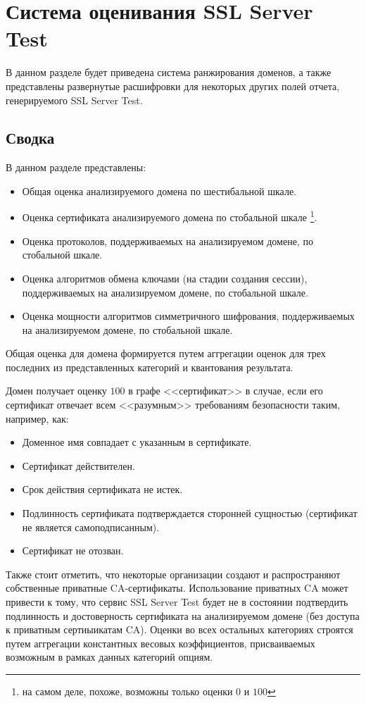 \section{Система оценивания SSL Server Test} \label{sct:best-practices}

В данном разделе будет приведена система ранжирования доменов, а также представлены развернутые расшифровки для некоторых других полей
отчета, генерируемого SSL Server Test.

\subsection{Сводка}

В данном разделе представлены:
\begin{itemize}
    \item Общая оценка анализируемого домена по шестибальной шкале.
    \item Оценка сертификата анализируемого домена по стобальной шкале \footnote{на самом деле, похоже, возможны только оценки $0$ и 
        $100$}.
    \item Оценка протоколов, поддерживаемых на анализируемом домене, по стобальной шкале. 
    \item Оценка алгоритмов обмена ключами (на стадии создания сессии), поддерживаемых на анализируемом домене, по 
        стобальной шкале.
    \item Оценка мощности алгоритмов симметричного шифрования, поддерживаемых на анализируемом домене, по стобальной шкале. 
\end{itemize}
Общая оценка для домена формируется путем аггрегации оценок для трех последних из представленных категорий и квантования результата. 

Домен получает оценку $100$ в графе <<сертификат>> в случае, если его сертификат отвечает всем <<разумным>> требованиям безопасности 
таким, например, как:
\begin{itemize}
    \item Доменное имя совпадает с указанным в сертификате. 
    \item Сертификат действителен.
    \item Срок действия сертификата не истек.
    \item Подлинность сертификата подтверждается сторонней сущностью (сертификат не является самоподписанным).
    \item Сертификат не отозван.
\end{itemize}
Также стоит отметить, что некоторые организации создают и распространяют собственные приватные CA-сертификаты. Использование 
приватных CA может привести к тому, что сервис SSL Server Test будет не в состоянии подтвердить подлинность и достоверность 
сертификата на анализируемом домене (без доступа к приватным сертиыикатам CA). Оценки во всех остальных категориях строятся путем
аггрегации константных весовых коэффициентов, присваиваемых возможным в рамках данных категорий опциям. 

